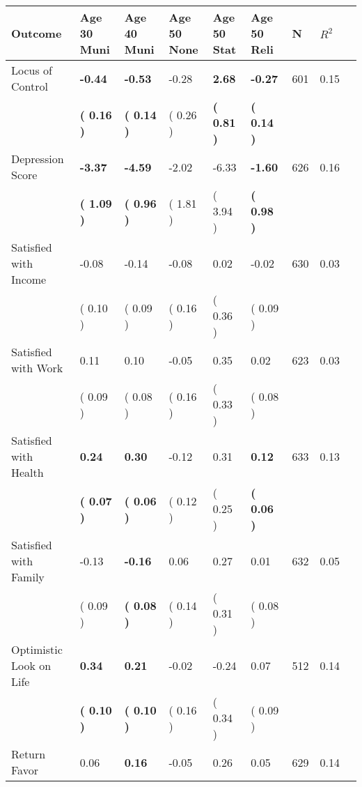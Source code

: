 \begin{tabular}{L{6.2cm} C{1.8cm} C{1.8cm} C{1.8cm} C{1.8cm} C{1.8cm} C{1.8cm} C{0.3cm} C{0.3cm}}
\toprule
 \textbf{Outcome} & \textbf{Age 30 Muni} & \textbf{Age 40 Muni} & \textbf{Age 50 None} & \textbf{Age 50 Stat} & \textbf{Age 50 Reli} & \textbf{N} & \textbf{$ R^2$} \\
\midrule
Locus of Control & \textbf{    -0.44} & \textbf{    -0.53} &     -0.28 & \textbf{     2.68} & \textbf{    -0.27}  & 601 &       0.15 \\ 
 & \textbf{(     0.16 )} & \textbf{(     0.14 )} & (     0.26 ) & \textbf{(     0.81 )} & \textbf{(     0.14 )}  & \\
Depression Score & \textbf{    -3.37} & \textbf{    -4.59} &     -2.02 &     -6.33 & \textbf{    -1.60}  & 626 &       0.16 \\ 
 & \textbf{(     1.09 )} & \textbf{(     0.96 )} & (     1.81 ) & (     3.94 ) & \textbf{(     0.98 )}  & \\
Satisfied with Income &     -0.08 &     -0.14 &     -0.08 &      0.02 &     -0.02  & 630 &       0.03 \\ 
 & (     0.10 ) & (     0.09 ) & (     0.16 ) & (     0.36 ) & (     0.09 )  & \\
Satisfied with Work &      0.11 &      0.10 &     -0.05 &      0.35 &      0.02  & 623 &       0.03 \\ 
 & (     0.09 ) & (     0.08 ) & (     0.16 ) & (     0.33 ) & (     0.08 )  & \\
Satisfied with Health & \textbf{     0.24} & \textbf{     0.30} &     -0.12 &      0.31 & \textbf{     0.12}  & 633 &       0.13 \\ 
 & \textbf{(     0.07 )} & \textbf{(     0.06 )} & (     0.12 ) & (     0.25 ) & \textbf{(     0.06 )}  & \\
Satisfied with Family &     -0.13 & \textbf{    -0.16} &      0.06 &      0.27 &      0.01  & 632 &       0.05 \\ 
 & (     0.09 ) & \textbf{(     0.08 )} & (     0.14 ) & (     0.31 ) & (     0.08 )  & \\
Optimistic Look on Life & \textbf{     0.34} & \textbf{     0.21} &     -0.02 &     -0.24 &      0.07  & 512 &       0.14 \\ 
 & \textbf{(     0.10 )} & \textbf{(     0.10 )} & (     0.16 ) & (     0.34 ) & (     0.09 )  & \\
Return Favor &      0.06 & \textbf{     0.16} &     -0.05 &      0.26 &      0.05  & 629 &       0.14 \\ 

\end{tabular}
